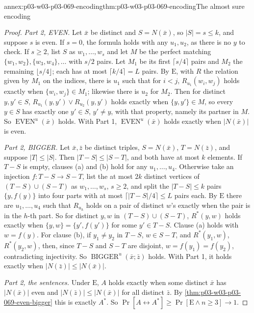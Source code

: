 \begin{annexitem}{annex:p03-w03-p03-069-encoding}{thm:p03-w03-p03-069-encoding}{The almost sure encoding}
\begin{proof}
\emph{Part 2, EVEN.}  Let \(\bar x\) be distinct and \(S=N(\bar x)\), so
\(|S|=s\leq k\), and suppose \(s\) is even.  If \(s=0\), the formula holds
with any \(u_1,u_2\), as there is no \(y\) to check.  If \(s\geq2\), list
\(S\) as \(w_1,\ldots,w_s\) and let \(M\) be the perfect matching
\(\{w_1,w_2\},\{w_3,w_4\},\ldots\) with \(s/2\) pairs.  Let \(M_1\) be its
first \(\lceil s/4\rceil\) pairs and \(M_2\) the remaining
\(\lfloor s/4\rfloor\); each has at most \(\lceil k/4\rceil=L\) pairs.  By
\(\mathrm E\), with \(R\) the relation given by \(M_1\) on the indices, there
is \(u_1\) such that for \(i<j\), \(R_{u_1}(w_i,w_j)\) holds exactly when
\(\{w_i,w_j\}\in M_1\); likewise there is \(u_2\) for \(M_2\).  Then for
distinct \(y,y'\in S\), \(R_{u_1}(y,y')\vee R_{u_2}(y,y')\) holds exactly
when \(\{y,y'\}\in M\), so every \(y\in S\) has exactly one \(y'\in S\),
\(y'\neq y\), with that property, namely its partner in \(M\).  So
\(\operatorname{EVEN}^u(\bar x)\) holds.  With Part 1,
\(\operatorname{EVEN}^u(\bar x)\) holds exactly when \(|N(\bar x)|\) is even.

\emph{Part 2, BIGGER.}  Let \(\bar x,\bar z\) be distinct triples,
\(S=N(\bar x)\), \(T=N(\bar z)\), and suppose \(|T|\leq|S|\).  Then
\(|T-S|\leq|S-T|\), and both have at most \(k\) elements.  If \(T-S\) is
empty, clauses (a) and (b) hold for any \(u_1,\ldots,u_4\).  Otherwise take
an injection \(f\colon T-S\to S-T\), list the at most \(2k\) distinct
vertices of \((T-S)\cup(S-T)\) as \(w_1,\ldots,w_{s}\), \(s\geq2\), and split
the \(|T-S|\leq k\) pairs \(\{y,f(y)\}\) into four parts with at most
\(\lceil|T-S|/4\rceil\leq L\) pairs each.  By \(\mathrm E\) there are
\(u_1,\ldots,u_4\) such that \(R_{u_h}\) holds on a pair of distinct
\(w\)'s exactly when the pair is in the \(h\)-th part.  So for distinct
\(y,w\) in \((T-S)\cup(S-T)\), \(R^*(y,w)\) holds exactly when
\(\{y,w\}=\{y',f(y')\}\) for some \(y'\in T-S\).  Clause (a) holds with
\(w=f(y)\).  For clause (b), if \(y_1\neq y_2\) in \(T-S\), \(w\in S-T\),
and \(R^*(y_1,w)\), \(R^*(y_2,w)\), then, since \(T-S\) and \(S-T\) are
disjoint, \(w=f(y_1)=f(y_2)\), contradicting injectivity.  So
\(\operatorname{BIGGER}^u(\bar x;\bar z)\) holds.  With Part 1, it holds
exactly when \(|N(\bar z)|\leq|N(\bar x)|\).

\emph{Part 2, the sentences.}  Under \(\mathrm E\), \(A\) holds exactly when
some distinct \(\bar x\) has \(|N(\bar x)|\) even and
\(|N(\bar z)|\leq|N(\bar x)|\) for all distinct \(\bar z\).  By
\cref{thm:p03-w03-p03-069-even-bigger} this is exactly \(A^*\).  So
\(\Pr[A\leftrightarrow A^*]\geq\Pr[\mathrm E\wedge n\geq3]\to1\).
\end{proof}
\end{annexitem}

